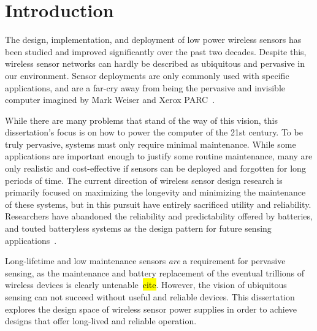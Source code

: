 \chapter{Introduction}
\label{chap:intro}

The design, implementation, and deployment of low power wireless sensors has been studied and improved significantly over the past two decades. Despite this, wireless sensor networks can hardly be described as ubiquitous and pervasive in our environment. Sensor deployments are only commonly used with specific applications, and are a far-cry away from being the pervasive and invisible computer imagined by Mark Weiser and Xerox PARC~\cite{weiser1991computer}.

While there are many problems that stand of the way of this vision, this dissertation's focus is on how to power the computer of the 21st century. 
To be truly pervasive, systems must only require minimal maintenance. While some applications are important enough to justify some routine maintenance, many are only realistic and cost-effective if sensors can be deployed and forgotten for long periods of time.
The current direction of wireless sensor design research is
primarily focused on maximizing the longevity and minimizing the maintenance of these systems, but in this pursuit have entirely sacrificed utility and reliability. Researchers have abandoned the reliability and predictability offered by batteries, and touted batteryless systems as the design pattern for future sensing applications~\cite{hester2017future}. 

Long-lifetime and low maintenance sensors \textit{are} a requirement for pervasive sensing, as the maintenance and battery replacement of the eventual trillions of wireless devices is clearly untenable~\hl{cite}. 
However, 
the vision of ubiquitous sensing can not succeed without useful and reliable devices. This dissertation explores the design space of wireless sensor power supplies in order to achieve designs that offer long-lived and reliable operation. 


